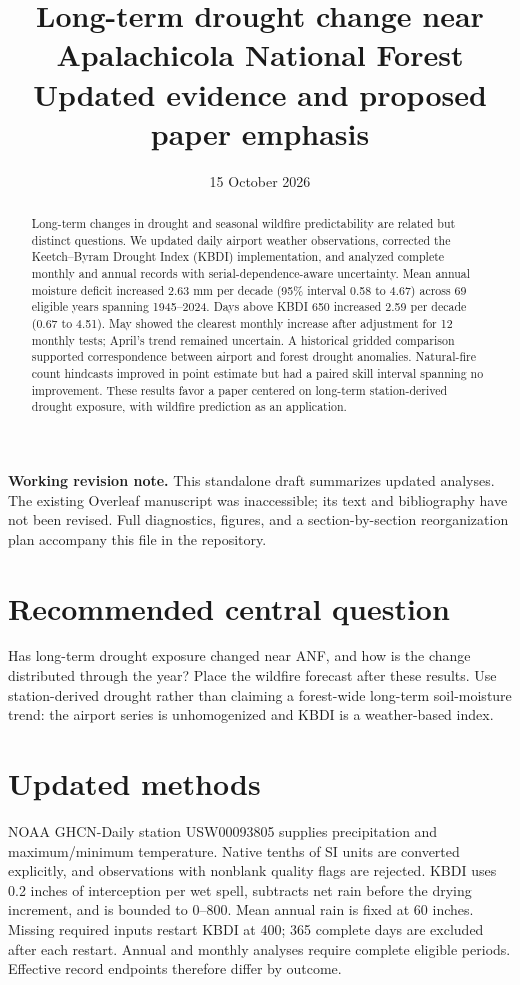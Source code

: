 \documentclass[11pt]{article}
\title{Long-term drought change near Apalachicola National Forest\\\large Updated evidence and proposed paper emphasis}
\author{}
\date{15 October 2026}
\begin{document}
\maketitle
\noindent\textbf{Working revision note.} This standalone draft summarizes updated analyses. The existing Overleaf manuscript was inaccessible; its text and bibliography have not been revised. Full diagnostics, figures, and a section-by-section reorganization plan accompany this file in the repository.

\begin{abstract}
Long-term changes in drought and seasonal wildfire predictability are related but distinct questions. We updated daily airport weather observations, corrected the Keetch--Byram Drought Index (KBDI) implementation, and analyzed complete monthly and annual records with serial-dependence-aware uncertainty. Mean annual moisture deficit increased 2.63 mm per decade (95\% interval 0.58 to 4.67) across 69 eligible years spanning 1945--2024. Days above KBDI 650 increased 2.59 per decade (0.67 to 4.51). May showed the clearest monthly increase after adjustment for 12 monthly tests; April's trend remained uncertain. A historical gridded comparison supported correspondence between airport and forest drought anomalies. Natural-fire count hindcasts improved in point estimate but had a paired skill interval spanning no improvement. These results favor a paper centered on long-term station-derived drought exposure, with wildfire prediction as an application.
\end{abstract}

\section{Recommended central question}
Has long-term drought exposure changed near ANF, and how is the change distributed through the year? Place the wildfire forecast after these results. Use station-derived drought rather than claiming a forest-wide long-term soil-moisture trend: the airport series is unhomogenized and KBDI is a weather-based index.

\section{Updated methods}
NOAA GHCN-Daily station USW00093805 supplies precipitation and maximum/minimum temperature. Native tenths of SI units are converted explicitly, and observations with nonblank quality flags are rejected. KBDI uses 0.2 inches of interception per wet spell, subtracts net rain before the drying increment, and is bounded to 0--800. Mean annual rain is fixed at 60 inches. Missing required inputs restart KBDI at 400; 365 complete days are excluded after each restart. Annual and monthly analyses require complete eligible periods. Effective record endpoints therefore differ by outcome.
\end{document}
